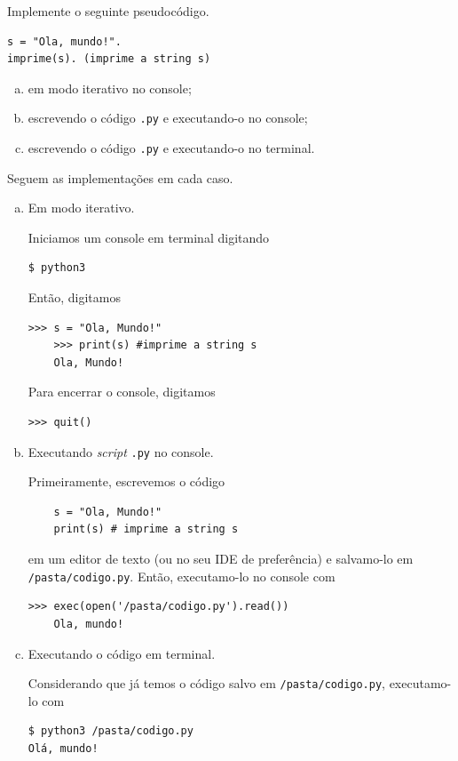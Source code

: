 \documentclass[12pt]{article}
\begin{document}
\begin{ex}
  Implemente o seguinte pseudocódigo.
\begin{verbatim}
s = "Ola, mundo!".
imprime(s). (imprime a string s)
\end{verbatim}
  \begin{enumerate}[a)]
  \item em modo iterativo no console;
  \item escrevendo o código \verb+.py+ e executando-o no console;
  \item escrevendo o código \verb+.py+ e executando-o no terminal.
  \end{enumerate}
  
   Seguem as implementações em cada caso.

  \begin{enumerate}[a)]
  \item Em modo iterativo.

    Iniciamos um console {\python} em terminal digitando
\begin{verbatim}
$ python3
\end{verbatim}
    Então, digitamos
    \begin{lstlisting}[xleftmargin=-3em]
    >>> s = "Ola, Mundo!"
    >>> print(s) #imprime a string s
    Ola, Mundo!
    \end{lstlisting}
    Para encerrar o console, digitamos
    \begin{lstlisting}[xleftmargin=-3em]
    >>> quit()
    \end{lstlisting}
    
  \item Executando {\it script} \verb+.py+ no console.

    Primeiramente, escrevemos o código
    \begin{lstlisting}
    s = "Ola, Mundo!"
    print(s) # imprime a string s
    \end{lstlisting}
    em um editor de texto (ou no seu IDE de preferência) e salvamo-lo em \verb+/pasta/codigo.py+. Então, executamo-lo no console {\python} com
    \begin{lstlisting}[xleftmargin=-3em]
    >>> exec(open('/pasta/codigo.py').read())
    Ola, mundo!
    \end{lstlisting}

  \item Executando o código em terminal.

    Considerando que já temos o código salvo em \verb+/pasta/codigo.py+, executamo-lo com
\begin{verbatim}
$ python3 /pasta/codigo.py
Olá, mundo!
\end{verbatim}
  \end{enumerate}
\end{ex}
\end{document}
